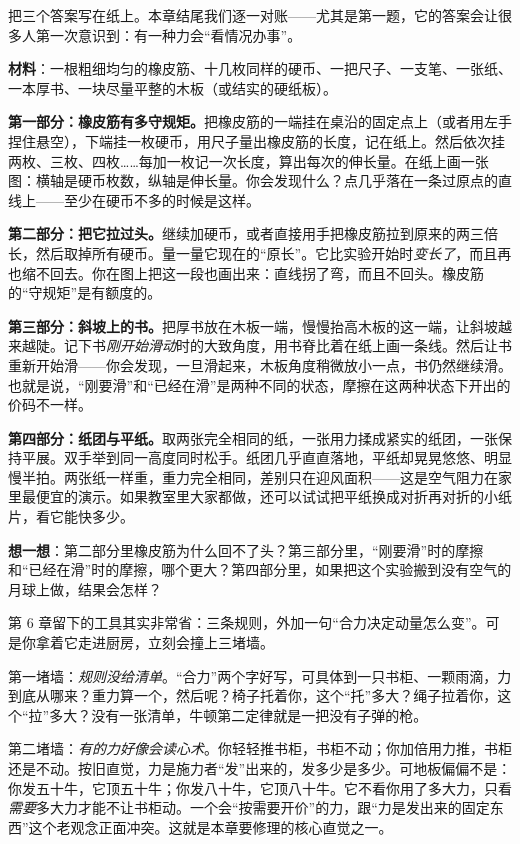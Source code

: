 把三个答案写在纸上。本章结尾我们逐一对账——尤其是第一题，它的答案会让很多人第一次意识到：有一种力会“看情况办事”。


\begin{experiment}[橡皮筋的脾气与斜坡上的书]
\textbf{材料}：一根粗细均匀的橡皮筋、十几枚同样的硬币、一把尺子、一支笔、一张纸、一本厚书、一块尽量平整的木板（或结实的硬纸板）。

\textbf{第一部分：橡皮筋有多守规矩。}把橡皮筋的一端挂在桌沿的固定点上（或者用左手捏住悬空），下端挂一枚硬币，用尺子量出橡皮筋的长度，记在纸上。然后依次挂两枚、三枚、四枚……每加一枚记一次长度，算出每次的伸长量。在纸上画一张图：横轴是硬币枚数，纵轴是伸长量。你会发现什么？点几乎落在一条过原点的直线上——至少在硬币不多的时候是这样。

\textbf{第二部分：把它拉过头。}继续加硬币，或者直接用手把橡皮筋拉到原来的两三倍长，然后取掉所有硬币。量一量它现在的“原长”。它比实验开始时\emph{变长了}，而且再也缩不回去。你在图上把这一段也画出来：直线拐了弯，而且不回头。橡皮筋的“守规矩”是有额度的。

\textbf{第三部分：斜坡上的书。}把厚书放在木板一端，慢慢抬高木板的这一端，让斜坡越来越陡。记下书\emph{刚开始滑动}时的大致角度，用书脊比着在纸上画一条线。然后让书重新开始滑——你会发现，一旦滑起来，木板角度稍微放小一点，书仍然继续滑。也就是说，“刚要滑”和“已经在滑”是两种不同的状态，摩擦在这两种状态下开出的价码不一样。

\textbf{第四部分：纸团与平纸。}取两张完全相同的纸，一张用力揉成紧实的纸团，一张保持平展。双手举到同一高度同时松手。纸团几乎直直落地，平纸却晃晃悠悠、明显慢半拍。两张纸一样重，重力完全相同，差别只在迎风面积——这是空气阻力在家里最便宜的演示。如果教室里大家都做，还可以试试把平纸换成对折再对折的小纸片，看它能快多少。

\textbf{想一想}：第二部分里橡皮筋为什么回不了头？第三部分里，“刚要滑”时的摩擦和“已经在滑”时的摩擦，哪个更大？第四部分里，如果把这个实验搬到没有空气的月球上做，结果会怎样？
\end{experiment}


第 6 章留下的工具其实非常省：三条规则，外加一句“合力决定动量怎么变”。可是你拿着它走进厨房，立刻会撞上三堵墙。

第一堵墙：\emph{规则没给清单}。“合力”两个字好写，可具体到一只书柜、一颗雨滴，力到底从哪来？重力算一个，然后呢？椅子托着你，这个“托”多大？绳子拉着你，这个“拉”多大？没有一张清单，牛顿第二定律就是一把没有子弹的枪。

第二堵墙：\emph{有的力好像会读心术}。你轻轻推书柜，书柜不动；你加倍用力推，书柜还是不动。按旧直觉，力是施力者“发”出来的，发多少是多少。可地板偏偏不是：你发五十牛，它顶五十牛；你发八十牛，它顶八十牛。它不看你用了多大力，只看\emph{需要}多大力才能不让书柜动。一个会“按需要开价”的力，跟“力是发出来的固定东西”这个老观念正面冲突。这就是本章要修理的核心直觉之一。


